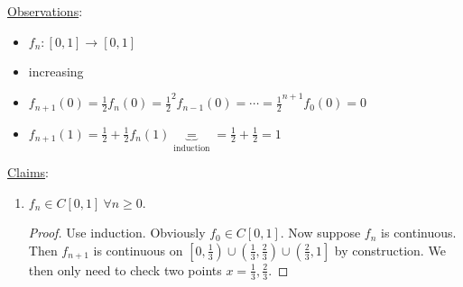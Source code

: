 \documentclass[a4paper]{article}
\theoremstyle{definition}
\begin{document}
\underline{Observations}:
\begin{itemize}
    \item $f_n:[0,1]\rightarrow [0,1]$
    \item increasing
    \item $f_{n+1}(0) = \frac12 f_n(0) = \frac12 ^2 f_{n-1}(0) = \cdots = \frac12 ^{n+1} f_0(0)=0$
    \item $f_{n+1}(1) = \frac12 + \frac12 f_n(1) \underbrace{=}_{\text{induction}} = \frac12 + \frac12=1 $
\end{itemize}
\underline{Claims}:
\begin{enumerate}
    \item $f_n \in C[0,1] \ \forall n\geq 0$.
    \begin{proof}
    Use induction. Obviously $f_0 \in C[0,1]$. Now suppose $f_n$ is continuous. Then $f_{n+1}$ is continuous on $\left[0,\frac13\right)\cup \left(\frac13,\frac23\right)\cup \left(\frac23,1\right]$ by construction. We then only need to check two points $x=\frac13,\frac23.$
    

\end{proof}
\end{enumerate}
\end{document}
